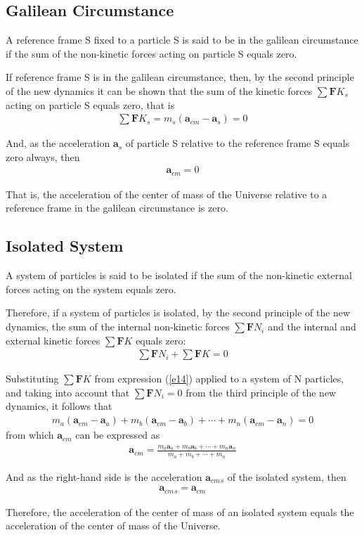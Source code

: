 \documentclass[12pt]{article}
\newcommand{\yS}{\medskip}%
\newcommand{\cA}{\centering}%
\newcommand{\cS}{\cA\subsection}%
\newcommand{\cs}[1]{}%
\newcommand{\vA}{\mathbf{a}}
\newcommand{\vF}{\mathbf{F}}
\newcommand{\nK}{{\scriptstyle K}}
\newcommand{\nN}{{\scriptstyle N}}
\newcommand{\mM}{m}
\newcommand{\ra}{_a}
\newcommand{\rb}{_b}
\newcommand{\rn}{_n}
\newcommand{\ri}{_i}
\newcommand{\rs}{_s}
\newcommand{\rcm}{_{cm}}
\begin{document}
{\cs{Galilean Circumstance}}
{\cS{Galilean Circumstance}}

\par A reference frame S fixed to a particle S is said to be in the galilean circumstance if the sum of the non-kinetic forces acting on particle S equals zero.
\par If reference frame S is in the galilean circumstance, then, by the second principle of the new dynamics it can be shown that the sum of the kinetic forces $\sum \vF\nK\rs$ acting on particle S equals zero, that is
\begin{eqnarray*}
\sum \vF\nK\rs = \mM\rs(\vA\rcm - \vA\rs) = 0
\end{eqnarray*}
\par And, as the acceleration $\vA\rs$ of particle S relative to the reference frame S equals zero always, then
\begin{eqnarray*}
\vA\rcm = 0
\end{eqnarray*}
\par That is, the acceleration of the center of mass of the Universe relative to a reference frame in the galilean circumstance is zero.

\yS \vspace{0em}

{\cs{Isolated System}}
{\cS{Isolated System}}

\par A system of particles is said to be isolated if the sum of the non-kinetic external forces acting on the system equals zero.
\par Therefore, if a system of particles is isolated, by the second principle of the new dynamics, the sum of the internal non-kinetic forces $\sum \vF\nN\ri$ and the internal and external kinetic forces $\sum \vF\nK$ equals zero:
\begin{eqnarray*}
\sum \vF\nN\ri + \sum \vF\nK = 0
\end{eqnarray*}
\par Substituting $\sum \vF\nK$ from expression (\ref{e14}) applied to a system of N particles, and taking into account that $\sum \vF\nN\ri = 0$ from the third principle of the new dynamics, it follows that
\begin{eqnarray*}
\mM\ra(\vA\rcm - \vA\ra) + \mM\rb(\vA\rcm - \vA\rb) + \cdots + \mM\rn(\vA\rcm - \vA\rn) = 0
\end{eqnarray*}
\noindent from which $\vA\rcm$ can be expressed as
\begin{eqnarray*}
\vA\rcm = \frac{\mM\ra\vA\ra + \mM\rb\vA\rb + \cdots + \mM\rn\vA\rn}{\mM\ra + \mM\rb + \cdots + \mM\rn}
\end{eqnarray*}
\par And as the right-hand side is the acceleration $\vA\rcm{\rs}$ of the isolated system, then
\begin{eqnarray*}
\vA\rcm{\rs} = \vA\rcm
\end{eqnarray*}
\par Therefore, the acceleration of the center of mass of an isolated system equals the acceleration of the center of mass of the Universe.
\end{document}
